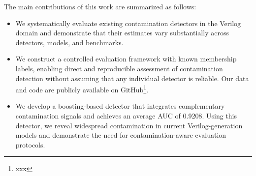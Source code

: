 The main contributions of this work are summarized as follows:
\begin{itemize}
\item We systematically evaluate existing contamination detectors in the Verilog domain and demonstrate that their estimates vary substantially across detectors, models, and benchmarks.

\item We construct a controlled evaluation framework with known membership labels, enabling direct and reproducible assessment of contamination detection without assuming that any individual detector is reliable. Our data and code are publicly available on GitHub\footnote{xxx}.

\item We develop a boosting-based detector that integrates complementary contamination signals and achieves an average AUC of 0.9208. Using this detector, we reveal widespread contamination in current Verilog-generation models and demonstrate the need for contamination-aware evaluation protocols.
\end{itemize}
